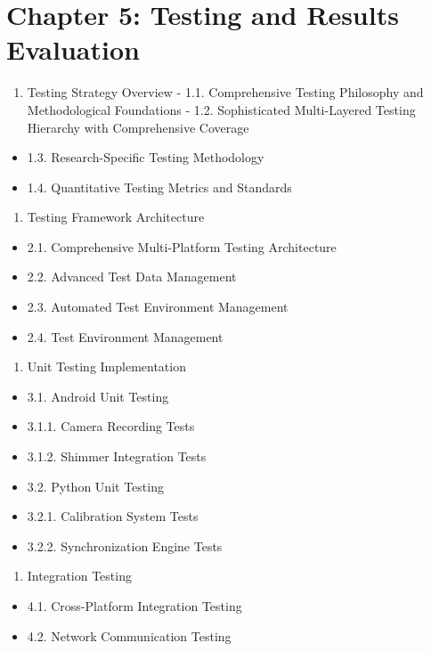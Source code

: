\documentclass[12pt,a4paper]{report}
\begin{document}
\section{Chapter 5: Testing and Results Evaluation}

\begin{enumerate}
\item Testing Strategy Overview
    -
    1.1. Comprehensive Testing Philosophy and Methodological Foundations
    -
    1.2. Sophisticated Multi-Layered Testing Hierarchy with Comprehensive Coverage
\end{enumerate}
\begin{itemize}
\item 1.3. Research-Specific Testing Methodology
\item 1.4. Quantitative Testing Metrics and Standards
\end{itemize}
\begin{enumerate}
\item Testing Framework Architecture
\end{enumerate}
\begin{itemize}
\item 2.1. Comprehensive Multi-Platform Testing Architecture
\item 2.2. Advanced Test Data Management
\item 2.3. Automated Test Environment Management
\item 2.4. Test Environment Management
\end{itemize}
\begin{enumerate}
\item Unit Testing Implementation
\end{enumerate}
\begin{itemize}
\item 3.1. Android Unit Testing
\item 3.1.1. Camera Recording Tests
\item 3.1.2. Shimmer Integration Tests
\item 3.2. Python Unit Testing
\item 3.2.1. Calibration System Tests
\item 3.2.2. Synchronization Engine Tests
\end{itemize}
\begin{enumerate}
\item Integration Testing
\end{enumerate}
\begin{itemize}
\item 4.1. Cross-Platform Integration Testing
\item 4.2. Network Communication Testing
\end{itemize}
\end{document}
